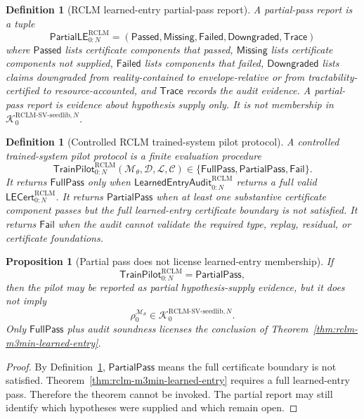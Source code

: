 \documentclass[11pt,a4paper]{article}
\newtheorem{proposition}[theorem]{Proposition}
\newtheorem{definition}[theorem]{Definition}
\newcommand{\Kcal}{\mathcal K}
\newcommand{\RCLM}{\mathrm{RCLM}}
\begin{document}
\begin{definition}[RCLM learned-entry partial-pass report]
\label{def:rclm-m3min-partial-pass-report}
A partial-pass report is a tuple
\[
\mathsf{PartialLE}_{0:N}^{\RCLM}
=(\mathsf{Passed},\mathsf{Missing},\mathsf{Failed},\mathsf{Downgraded},\mathsf{Trace})
\]
where $\mathsf{Passed}$ lists certificate components that passed, $\mathsf{Missing}$ lists certificate components not supplied, $\mathsf{Failed}$ lists components that failed, $\mathsf{Downgraded}$ lists claims downgraded from reality-contained to envelope-relative or from tractability-certified to resource-accounted, and $\mathsf{Trace}$ records the audit evidence.  A partial-pass report is evidence about hypothesis supply only.  It is not membership in $\Kcal_0^{\RCLM\text{-}\mathrm{SV\mbox{-}seedlib},N}$.
\end{definition}

\begin{definition}[Controlled RCLM trained-system pilot protocol]
\label{def:rclm-m3min-trained-pilot-protocol}
A controlled trained-system pilot protocol is a finite evaluation procedure
\[
\mathsf{TrainPilot}_{0:N}^{\RCLM}
(\mathcal M_\theta,\mathcal D,\mathcal L,\mathcal C)
\in
\{\mathsf{FullPass},\mathsf{PartialPass},\mathsf{Fail}\}.
\]
It returns $\mathsf{FullPass}$ only when $\mathsf{LearnedEntryAudit}_{0:N}^{\RCLM}$ returns a full valid $\mathsf{LECert}_{0:N}^{\RCLM}$.  It returns $\mathsf{PartialPass}$ when at least one substantive certificate component passes but the full learned-entry certificate boundary is not satisfied.  It returns $\mathsf{Fail}$ when the audit cannot validate the required type, replay, residual, or certificate foundations.
\end{definition}

\begin{proposition}[Partial pass does not license learned-entry membership]
\label{prop:rclm-m3min-partial-pass-not-membership}
If
\[
\mathsf{TrainPilot}_{0:N}^{\RCLM}=\mathsf{PartialPass},
\]
then the pilot may be reported as partial hypothesis-supply evidence, but it does not imply
\[
\rho_0^{\mathcal M_\theta}
\in
\Kcal_0^{\RCLM\text{-}\mathrm{SV\mbox{-}seedlib},N}.
\]
Only $\mathsf{FullPass}$ plus audit soundness licenses the conclusion of Theorem~\ref{thm:rclm-m3min-learned-entry}.
\end{proposition}

\begin{proof}
By Definition~\ref{def:rclm-m3min-trained-pilot-protocol}, $\mathsf{PartialPass}$ means the full certificate boundary is not satisfied.  Theorem~\ref{thm:rclm-m3min-learned-entry} requires a full learned-entry pass.  Therefore the theorem cannot be invoked.  The partial report may still identify which hypotheses were supplied and which remain open.
\end{proof}
\end{document}
